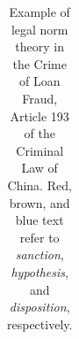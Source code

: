 
\begin{table}[]
    \centering
    \scriptsize
    \caption{Example of legal norm theory in the Crime of Loan Fraud, Article 193 of the Criminal Law of China. Red, brown, and blue text refer to \textit{sanction}, \textit{hypothesis}, and \textit{disposition}, respectively.}
    \begin{tabular}{p{}}
        \toprule

\end{tabular}
\end{table}
